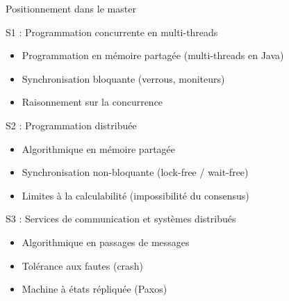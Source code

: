 
\begingroup

\begin{frame}{Positionnement dans le master}

  \begin{block}{S1 : Programmation concurrente en multi-threads}
    \begin{itemize}
    \item Programmation en mémoire partagée (multi-threads en Java)
    \item Synchronisation bloquante (verrous, moniteurs)
    \item Raisonnement sur la concurrence
    \end{itemize}
  \end{block}

  \begin{alertblock}{S2 : Programmation distribuée}
    \begin{itemize}
    \item Algorithmique en mémoire partagée
    \item Synchronisation non-bloquante (lock-free / wait-free)
    \item Limites à la calculabilité (impossibilité du consensus)
    \end{itemize}
  \end{alertblock}

  \begin{block}{S3 : Services de communication et systèmes distribués}
    \begin{itemize}
    \item Algorithmique en passages de messages
    \item Tolérance aux fautes (crash)
    \item Machine à états répliquée (Paxos)
    \end{itemize}
  \end{block}

\end{frame}

\endgroup
\endinput
